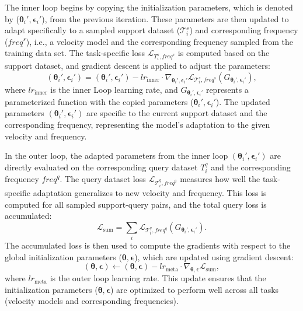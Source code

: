 The inner loop begins by copying the initialization parameters, which is denoted by ($\boldsymbol{\theta}_i', \boldsymbol{\epsilon}_i'$), from the previous iteration. These parameters are then updated to adapt specifically to a sampled support dataset ($\mathcal{T}_i^s$) and corresponding frequency ($\textit{freq}^s$), i.e., a velocity model and the corresponding frequency sampled from the training data set. The task-specific loss $\mathcal{L}_{T_i^s, \textit{freq}^s}$ is computed based on the support dataset, and gradient descent is applied to adjust the parameters:
\begin{equation}\label{eq11}
(\boldsymbol{\theta}_i', \boldsymbol{\epsilon}_i') = (\boldsymbol{\theta}_i', \boldsymbol{\epsilon}_i') - lr_{\text{inner}} \cdot \nabla_{\boldsymbol{\theta}_i', \boldsymbol{\epsilon}_i'} \mathcal{L}_{\mathcal{T}_i^s, \textit{freq}^s}(G_{\boldsymbol{\theta}_i', \boldsymbol{\epsilon}_i'}),
\end{equation}
where $lr_{\text{inner}}$ is the inner Loop learning rate, and $G_{\boldsymbol{\theta}_i', \boldsymbol{\epsilon}_i'}$ represents a parameterized function with the copied parameters ($\boldsymbol{\theta}_i', \boldsymbol{\epsilon}_i'$). The updated parameters $(\boldsymbol{\theta}_i', \boldsymbol{\epsilon}_i')$ are specific to the current support dataset and the corresponding frequency, representing the model's adaptation to the given velocity and frequency. 

In the outer loop, the adapted parameters from the inner loop $(\boldsymbol{\theta}_i', \boldsymbol{\epsilon}_i')$ are directly evaluated on the corresponding query dataset $T_i^q$ and the corresponding frequency $\textit{freq}^q$. The query dataset loss $\mathcal{L}_{\mathcal{T}_i^q, \textit{freq}^q}$ measures how well the task-specific adaptation generalizes to new velocity and frequency. This loss is computed for all sampled support-query pairs, and the total query loss is accumulated:
\begin{equation}\label{eq12}
\mathcal{L}_{\text{sum}} = \sum_i \mathcal{L}_{\mathcal{T}_i^q, \textit{freq}^q}(G_{\boldsymbol{\theta}_i', \boldsymbol{\epsilon}_i'}).
\end{equation}
The accumulated loss is then used to compute the gradients with respect to the global initialization parameters ($\boldsymbol{\theta}, \boldsymbol{\epsilon}$), which are updated using gradient descent:
\begin{equation}\label{eq13}
(\boldsymbol{\theta}, \boldsymbol{\epsilon}) \leftarrow (\boldsymbol{\theta}, \boldsymbol{\epsilon}) - lr_{\text{meta}} \cdot \nabla_{\boldsymbol{\theta}, \boldsymbol{\epsilon}} \mathcal{L}_{\text{sum}},
\end{equation}
where $lr_{\text{meta}}$ is the outer loop learning rate. This update ensures that the initialization parameters ($\boldsymbol{\theta}, \boldsymbol{\epsilon}$) are optimized to perform well across all tasks (velocity models and corresponding frequencies). 

